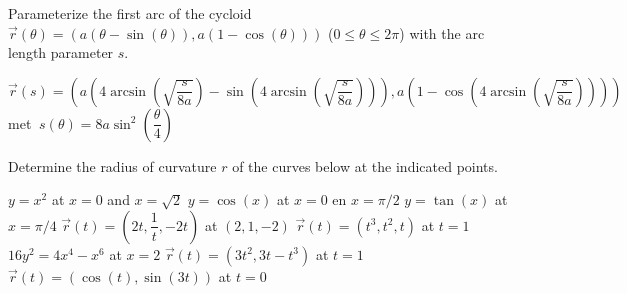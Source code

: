     
\ifanalysis
     \begin{Exercise}[difficulty = 3] Parameterize the first arc of the cycloid $\vec r(\theta)= \left(a(\theta-\sin (\theta)), a(1-\cos (\theta)) \right)$ ($0 \leq \theta \leq 2\pi $) with the arc length parameter $s$.
     \end{Exercise}

    \begin{Answer}
        $\vec r(s)= \left(a\left( 4 \arcsin \left(\sqrt{\dfrac{s}{8a}}\right) - \sin \left( 4 \arcsin \left(\sqrt{\dfrac{s}{8a}} \right) \right) \right) ,a\left(1-\cos \left( 4 \arcsin \left(\sqrt{\dfrac{s}{8a}} \right) \right) \right) \right)$ \\[0.2cm] 
     met $\ s(\theta) = 8a\sin^2 \left(\dfrac{\theta}{4} \right)$
    \end{Answer}
\fi

\begin{Exercise} Determine the radius of curvature $r$ of the curves below at the indicated points. \begin{multicols}{2}
         \Question[difficulty=1] $y=x^2$ \qquad at \quad $x=0$ and $x=\sqrt{2}$
         \Question[difficulty=1] $y=\cos(x)$ \qquad at \quad $x=0$ en $x=\pi/2$
         \Question[difficulty=1] $y = \tan(x) $ \qquad at \quad $x=\pi/4$ 
         \Question[difficulty=2] $\vec r(t) = \left(2t, \dfrac{1}{t}, -2t \right)$ \qquad at \quad $(2,1,-2)$
         \Question[difficulty=2] $\vec r(t) = \left(t^3, t^2, t \right)$ \qquad at \quad $t=1$
         \Question[difficulty=3] $16y^2=4x^4-x^6$  \qquad at \quad $x=2$ 
        \Question[difficulty=2] $ \vec r(t) = \left(3t^2, 3t-t^3\right)$ \qquad at \quad $t=1$  
        \Question[difficulty=2] $\vec r(t) =  \left(\cos(t),\sin(3t)\right) $ \qquad at \quad $t=0$ 
        \EndCurrentQuestion
\end{multicols}

\end{Exercise}


